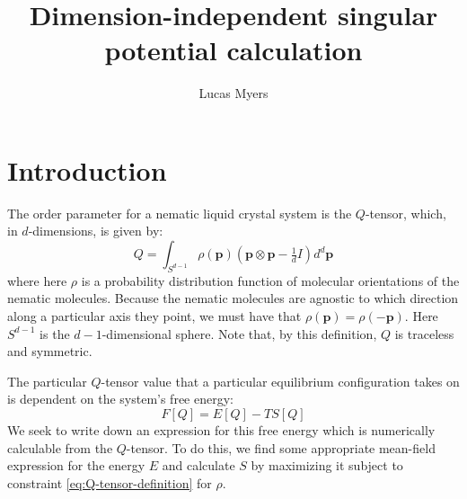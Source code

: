 \documentclass[reqno]{article}
\begin{document}
\title{Dimension-independent singular potential calculation}
\author{Lucas Myers}
\maketitle

\section{Introduction}
The order parameter for a nematic liquid crystal system is the $Q$-tensor, which, in $d$-dimensions, is given by:
\begin{equation} \label{eq:Q-tensor-definition}
    Q
    =
    \int_{S^{d - 1}} \rho(\mathbf{p}) \left(\mathbf{p} \otimes \mathbf{p} - \tfrac{1}{d} I\right) d^d \mathbf{p}
\end{equation}
where here $\rho$ is a probability distribution function of molecular orientations of the nematic molecules.
Because the nematic molecules are agnostic to which direction along a particular axis they point, we must have that $\rho(\mathbf{p}) = \rho(-\mathbf{p})$. 
Here $S^{d - 1}$ is the $d-1$-dimensional sphere.
Note that, by this definition, $Q$ is traceless and symmetric.

The particular $Q$-tensor value that a particular equilibrium configuration takes on is dependent on the system's free energy:
\begin{equation}
    F[Q]
    =
    E[Q]
    - T S[Q]
\end{equation}
We seek to write down an expression for this free energy which is numerically calculable from the $Q$-tensor.
To do this, we find some appropriate mean-field expression for the energy $E$ and calculate $S$ by maximizing it subject to constraint \eqref{eq:Q-tensor-definition} for $\rho$.
\end{document}
